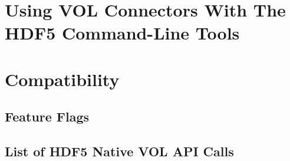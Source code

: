 \section{Using VOL Connectors With The HDF5 Command-Line Tools}

\section{Compatibility}
\subsection{Feature Flags}
\thgfuturewarning
\subsection{List of HDF5 Native VOL API Calls}

